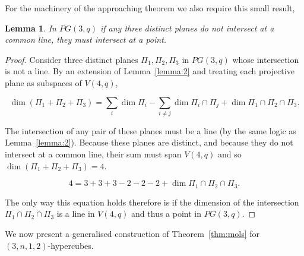 \documentclass{article}
\newtheorem{lemma}{Lemma}
\begin{document}
    For the machinery of the approaching theorem we also require this small result, 

    \begin{lemma}\label{lemma:3}
        In \(PG(3, q)\) if any three distinct planes do not intersect at a common line, they must intersect at a point. 
    \end{lemma}
    \begin{proof}
        Consider three distinct planes \(\Pi_1, \Pi_2, \Pi_3\) in \(PG(3, q)\) whose intersection is not a line. By an extension of Lemma~\ref{lemma:2} and treating each projective plane as subspaces of \(V(4, q)\),
        
        \begin{equation*}
            \dim (\Pi_1 + \Pi_2 + \Pi_3) = \sum_{i} \dim \Pi_i - \sum_{i \neq j} \dim \Pi_i \cap \Pi_j + \dim \Pi_1 \cap \Pi_2 \cap \Pi_3.
        \end{equation*}

        The intersection of any pair of these planes must be a line (by the same logic as Lemma~\ref{lemma:2}). Because these planes are distinct, and because they do not intersect at a common line, their sum must span \(V(4, q)\) and so \(\dim (\Pi_1 + \Pi_2 + \Pi_3) = 4\).

        \begin{equation*}
            4 = 3 + 3 + 3 - 2 - 2 - 2 + \dim \Pi_1 \cap \Pi_2 \cap \Pi_3.
        \end{equation*}

        The only way this equation holds therefore is if the dimension of the intersection \(\Pi_1 \cap \Pi_2 \cap \Pi_3\) is a line in \(V(4, q)\) and thus a point in \(PG(3, q)\).
    \end{proof}

    We now present a generalised construction of Theorem~\ref{thm:mols} for \((3, n, 1, 2)\)-hypercubes.
\end{document}
